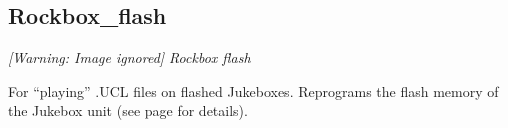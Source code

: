 \subsection{Rockbox\_flash}
{\centering\itshape
  [Warning: Image ignored] %
 \newline
Rockbox flash
\par}

For ``playing'' .UCL files on flashed Jukeboxes. Reprograms the flash memory of
the Jukebox unit (see page \pageref{ref:Rockboxinflash} for details).


